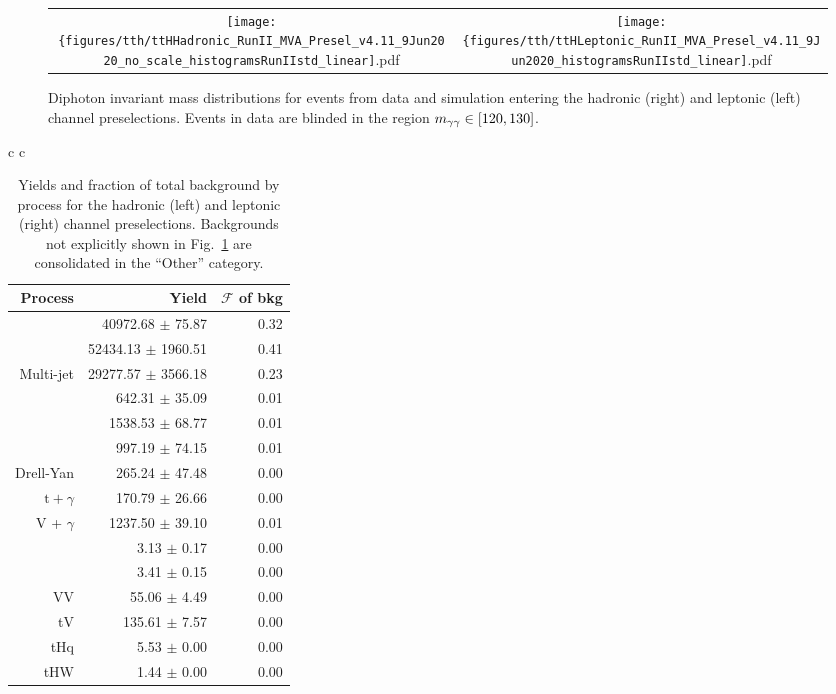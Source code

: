 \begin{figure} [h!]
    \centering
    \begin{tabular}{c c}
        \texttt{[image: \{figures/tth/ttHHadronic\_RunII\_MVA\_Presel\_v4.11\_9Jun2020\_no\_scale\_histogramsRunIIstd\_linear]}.pdf} &
        \texttt{[image: \{figures/tth/ttHLeptonic\_RunII\_MVA\_Presel\_v4.11\_9Jun2020\_histogramsRunIIstd\_linear]}.pdf} 
    \end{tabular}
    \caption{Diphoton invariant mass distributions for events from data and simulation entering the hadronic (right) and leptonic (left) channel preselections. Events in data are blinded in the region $m_{\gamma\gamma} \in [120, 130]$.}
    \label{fig:tth_mgg_presel_datamc}
\end{figure}

\begin{table} [h!]
    \centering
    \caption{Yields and fraction of total background by process for the hadronic (left) and leptonic (right) channel preselections. Backgrounds not explicitly shown in Fig.~\ref{fig:tth_mgg_presel_datamc} are consolidated in the ``Other'' category.}
    \begin{tabular}{c c}
    	\begin{tabular}{ r || r | r} \hline \hline
			Process & Yield & $\mathcal F$ of bkg \\ \hline
			\dipho & 40972.68 $\pm$ 75.87 & 0.32 \\ 
			\gjets & 52434.13 $\pm$ 1960.51 & 0.41 \\ 
			Multi-jet & 29277.57 $\pm$ 3566.18 & 0.23 \\ 
			\ttgg & 642.31 $\pm$ 35.09 & 0.01 \\ 
			\ttg & 1538.53 $\pm$ 68.77 & 0.01 \\ 
			\ttb & 997.19 $\pm$ 74.15 & 0.01 \\ 
			Drell-Yan & 265.24 $\pm$ 47.48 & 0.00 \\ 
			$\text{t} + \gamma$ & 170.79 $\pm$ 26.66 & 0.00 \\ 
			V + $\gamma$ & 1237.50 $\pm$ 39.10 & 0.01 \\ 
			\ttW & 3.13 $\pm$ 0.17 & 0.00 \\ 
			\ttZ & 3.41 $\pm$ 0.15 & 0.00 \\ 
			VV & 55.06 $\pm$ 4.49 & 0.00 \\ 
			tV & 135.61 $\pm$ 7.57 & 0.00 \\  \hline
			tHq & 5.53 $\pm$ 0.00 & 0.00 \\
            tHW & 1.44 $\pm$ 0.00 & 0.00 \\

\end{tabular}
\end{tabular}
\end{table}
